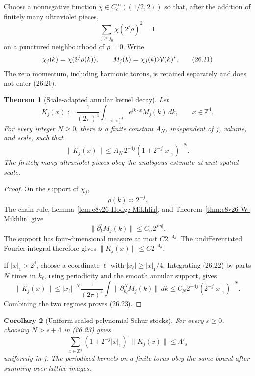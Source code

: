 \documentclass[11pt,oneside]{book}
\newtheorem{theorem}{Theorem}[chapter]
\newtheorem{corollary}[theorem]{Corollary}
\theoremstyle{definition}
\theoremstyle{remark}
\begin{document}
Choose a nonnegative function
\(\chi\in C_c^\infty((1/2,2))\) so that, after the addition of finitely
many ultraviolet pieces,
\[
                  \sum_{j\geq j_0}\chi(2^j\rho)^2=1              \tag{26.20}
\]
on a punctured neighbourhood of \(\rho=0\).  Write
\[
                  \chi_j(k)=\chi(2^j\rho(k)),\qquad
                  M_j(k)=\chi_j(k){\cal W}(k)^*.                 \tag{26.21}
\]
The zero momentum, including harmonic torons, is retained separately
and does not enter (26.20).

\begin{theorem}[Scale-adapted annular kernel decay]
\label{thm:e8v26-annular-kernel}
Let
\[
 K_j(x):=\frac1{(2\pi)^4}\int_{[-\pi,\pi]^4}
             e^{ik\cdot x}M_j(k)\,dk,\qquad x\in{\mathbb Z}^4.   \tag{26.22}
\]
For every integer \(N\geq0\), there is a finite constant \(A_N\),
independent of \(j\), volume, and scale, such that
\[
\boxed{\qquad
 \|K_j(x)\|
 \leq A_N\,2^{-4j}
       \left(1+2^{-j}|x|_1\right)^{-N}.
\qquad}                                                           \tag{26.23}
\]
The finitely many ultraviolet pieces obey the analogous estimate at
unit spatial scale.
\end{theorem}

\begin{proof}
On the support of \(\chi_j\),
\[
                         \rho(k)\asymp2^{-j}.                     \tag{26.24}
\]
The chain rule, Lemma~\ref{lem:e8v26-Hodge-Mikhlin}, and
Theorem~\ref{thm:e8v26-W-Mikhlin} give
\[
              \|\partial_k^\eta M_j(k)\|
              \leq C_{\eta}\,2^{j|\eta|}.                         \tag{26.25}
\]
The support has four-dimensional measure at most \(C2^{-4j}\).
The undifferentiated Fourier integral therefore gives
\(\|K_j(x)\|\leq C2^{-4j}\).

If \(|x|_1>2^j\), choose a coordinate \(\ell\) with
\(|x_\ell|\geq|x|_1/4\).  Integrating (26.22) by parts \(N\) times in
\(k_\ell\), using periodicity and the smooth annular support, gives
\[
 \|K_j(x)\|
 \leq |x_\ell|^{-N}
       \frac1{(2\pi)^4}\int
       \|\partial_{k_\ell}^NM_j(k)\|\,dk
 \leq C_N2^{-4j}
       (2^{-j}|x|_1)^{-N}.
\]
Combining the two regimes proves (26.23).
\end{proof}

\begin{corollary}[Uniform scaled polynomial Schur stocks]
\label{cor:e8v26-annular-Schur}
For every \(s\geq0\), choosing \(N>s+4\) in (26.23) gives
\[
\boxed{\qquad
 \sum_{x\in{\mathbb Z}^4}
 (1+2^{-j}|x|_1)^s\|K_j(x)\|
 \leq A'_s
\qquad}                                                           \tag{26.26}
\]
uniformly in \(j\).  The periodized kernels on a finite torus obey the
same bound after summing over lattice images.
\end{corollary}
\end{document}
